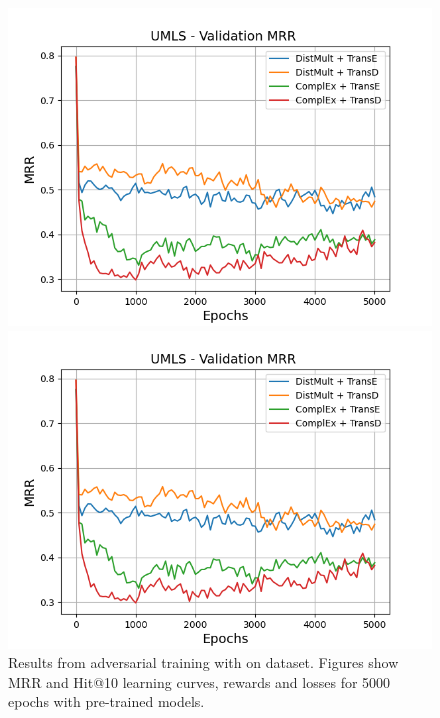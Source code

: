 \begin{figure}
    \begin{minipage}{.5\textwidth}
      \centering
      \includegraphics[width=\linewidth]{figures/results/gan_train/pretrained/uncertainty/max/entropy/umls/5k_epochs/uncertainty_umls_mrrs.png}
    \end{minipage}%
     \begin{minipage}{.5\textwidth}
      \centering
      \includegraphics[width=\linewidth]{figures/results/gan_train/pretrained/uncertainty/max/entropy/umls/5k_epochs/uncertainty_umls_mrrs.png}
    \end{minipage}%
    \caption{Results from adversarial training with \usmax on \umls dataset.
    Figures show MRR and Hit@10 learning curves, rewards and losses for 5000 epochs with pre-trained models.}
    \label{fig:gan_train_pretrained_usmax_umls}
\end{figure}
